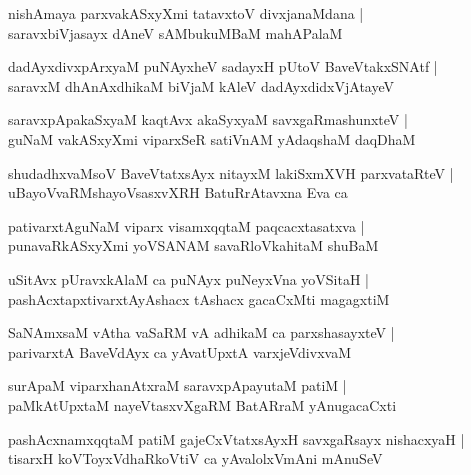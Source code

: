 \documentclass[twoside,12pt,openright]{book}
\newcounter{shloka}[chapter]
\begin{document}
\begin{shloka}%
nishAmaya parxvakASxyXmi tatavxtoV divxjanaMdana |\\
saravxbiVjasayx dAneV sAMbukuMBaM mahAPalaM 
\end{shloka}

\begin{shloka}%
dadAyxdivxpArxyaM puNAyxheV sadayxH pUtoV BaveVtakxSNAtf |\\
saravxM dhAnAxdhikaM biVjaM kAleV dadAyxdidxVjAtayeV 
\end{shloka}

\begin{shloka}%
saravxpApakaSxyaM kaqtAvx akaSyxyaM savxgaRmashunxteV |\\
guNaM vakASxyXmi viparxSeR satiVnAM yAdaqshaM daqDhaM 
\end{shloka}

\begin{shloka}%
shudadhxvaMsoV BaveVtatxsAyx nitayxM lakiSxmXVH parxvataRteV |\\
uBayoVvaRMshayoVsasxvXRH BatuRrAtavxna Eva ca 
\end{shloka}

\begin{shloka}%
pativarxtAguNaM viparx visamxqqtaM paqcacxtasatxva |\\
punavaRkASxyXmi yoVSANAM savaRloVkahitaM shuBaM 
\end{shloka}

\begin{shloka}%
uSitAvx pUravxkAlaM ca puNAyx puNeyxVna yoVSitaH |\\
pashAcxtapxtivarxtAyAshacx tAshacx gacaCxMti magagxtiM 
\end{shloka}

\begin{shloka}%
SaNAmxsaM vAtha vaSaRM vA adhikaM ca parxshasayxteV |\\
parivarxtA BaveVdAyx ca yAvatUpxtA varxjeVdivxvaM 
\end{shloka}

\begin{shloka}%
surApaM viparxhanAtxraM saravxpApayutaM patiM |\\
paMkAtUpxtaM nayeVtasxvXgaRM BatARraM yAnugacaCxti 
\end{shloka}

\begin{shloka}%
pashAcxnamxqqtaM patiM gajeCxVtatxsAyxH savxgaRsayx nishacxyaH |\\
tisarxH koVToyxVdhaRkoVtiV ca yAvalolxVmAni mAnuSeV 
\end{shloka}
\end{document}
